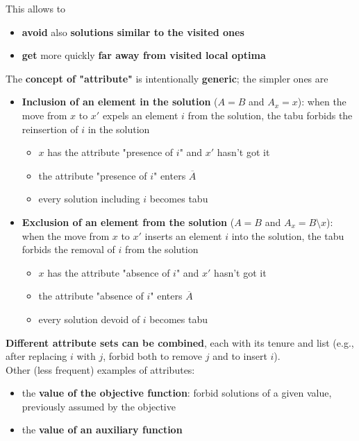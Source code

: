 \documentclass[11pt]{article}
\begin{document}
	This allows to
	\begin{itemize}
		\item \textbf{avoid} also \textbf{solutions similar to the visited ones}
		\item \textbf{get} more quickly \textbf{far away from visited local optima}
	\end{itemize}
	
	\newpage
	
	The \textbf{concept of "attribute"} is intentionally \textbf{generic}; the simpler ones are
	\begin{itemize}
		\item \textbf{Inclusion of an element in the solution} ($A = B$ and $A_x = x$): when the move from $x$ to $x'$ expels an element $i$ from the solution, the tabu forbids the reinsertion of $i$ in the solution
		\begin{itemize}
			\item $x$ has the attribute "presence of $i$" and $x'$ hasn't got it
			\item the attribute "presence of $i$" enters $\overline{A}$
			\item every solution including $i$ becomes tabu
		\end{itemize}
		\nn
		
		\item \textbf{Exclusion of an element from the solution} ($A = B$ and $A_x = B \setminus x$): when the move from $x$ to $x'$ inserts an element $i$ into the solution, the tabu forbids the removal of $i$ from the solution
		\begin{itemize}
			\item $x$ has the attribute "absence of $i$" and $x'$ hasn't got it
			\item the attribute "absence of $i$" enters $\overline{A}$
			\item every solution devoid of $i$ becomes tabu
		\end{itemize}
		\nn
	\end{itemize}
	
	\textbf{Different attribute sets can be combined}, each with its tenure and list (e.g., after replacing $i$ with $j$, forbid both to remove $j$ and to insert $i$).\\
	
	Other (less frequent) examples of attributes:
	\begin{itemize}
		\item the \textbf{value of the objective function}: forbid solutions of a given value, previously assumed by the objective
		\item the \textbf{value of an auxiliary function}
	\end{itemize}
	
\end{document}
